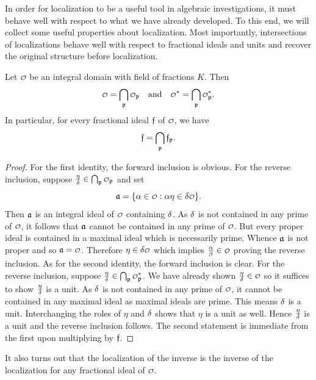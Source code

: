     In order for localization to be a useful tool in algebraic investigations, it must behave well with respect to what we have already developed. To this end, we will collect some useful properties about localization. Most importantly, intersections of localizations behave well with respect to fractional ideals and units and recover the original structure before localization.

    \begin{proposition}\label{prop:ring_is_intersection_of_all_localizations}
      Let \(\smc{O}\) be an integral domain with field of fractions \(K\). Then
      \[
        \smc{O} = \bigcap_{\mf{p}}\smc{O}_{\mf{p}} \quad \text{and} \quad \smc{O}^{\ast} = \bigcap_{\mf{p}}\smc{O}_{\mf{p}}^{\ast}.
      \]
      In particular, for every fractional ideal \(\mathfrak{f}\) of \(\smc{O}\), we have
      \[
        \mathfrak{f} = \bigcap_{\mathfrak{p}}\mathfrak{f}_{\mathfrak{p}}.
      \]
    \end{proposition}
    \begin{proof}
      For the first identity, the forward inclusion is obvious. For the reverse inclusion, suppose \(\frac{\eta}{\d} \in \bigcap_{\mf{p}}\smc{O}_{\mf{p}}\) and set
      \[
        \mf{a} = \{\a \in \smc{O}:\a\eta \in \d\smc{O}\}.
      \]
      Then \(\mathfrak{a}\) is an integral ideal of \(\smc{O}\) containing \(\delta\). As \(\delta\) is not contained in any prime of \(\smc{O}\), it follows that \(\mathfrak{a}\) cannot be contained in any prime of \(\smc{O}\). But every proper ideal is contained in a maximal ideal which is necessarily prime. Whence \(\mathfrak{a}\) is not proper and so \(\mf{a} = \smc{O}\). Therefore \(\eta \in \d\smc{O}\) which implies \(\frac{\a}{\b} \in \smc{O}\) proving the reverse inclusion. As for the second identity, the forward inclusion is clear. For the reverse inclusion, suppose \(\frac{\eta}{\d} \in \bigcap_{\mf{p}}\smc{O}_{\mf{p}}^{\ast}\). We have already shown \(\frac{\eta}{\d} \in \smc{O}\) so it suffices to show \(\frac{\eta}{\delta}\) is a unit. As \(\delta\) is not contained in any prime of \(\smc{O}\), it cannot be contained in any maximal ideal as maximal ideals are prime. This means \(\delta\) is a unit. Interchanging the roles of \(\eta\) and \(\delta\) shows that \(\eta\) is a unit as well. Hence \(\frac{\eta}{\delta}\) is a unit and the reverse inclusion follows. The second statement is immediate from the first upon multiplying by \(\mathfrak{f}\).
    \end{proof}

    It also turns out that the localization of the inverse is the inverse of the localization for any fractional ideal of \(\smc{O}\).

